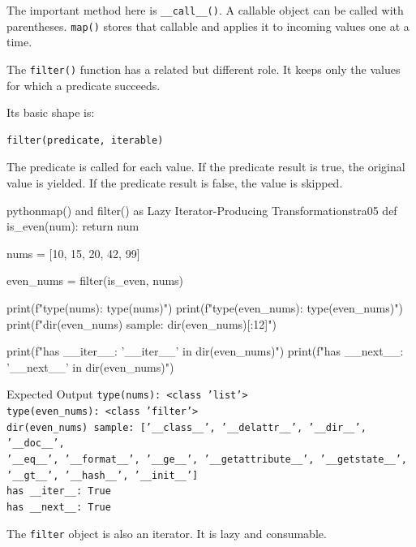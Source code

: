 \documentclass[a4paper,twoside]{report}
\begin{document}
The important method here is \texttt{\_\_call\_\_()}. A callable object can be called with parentheses. \texttt{map()} stores that callable and applies it to incoming values one at a time.

The \texttt{filter()} function has a related but different role. It keeps only the values for which a predicate succeeds.

Its basic shape is:

\begin{verbatim}
filter(predicate, iterable)
\end{verbatim}

The predicate is called for each value. If the predicate result is true, the original value is yielded. If the predicate result is false, the value is skipped.

\begin{codebox}[]{python}{map() and filter() as Lazy Iterator-Producing Transformations}{tra05}
def is_even(num):
    return num %

nums = [10, 15, 20, 42, 99]

even_nums = filter(is_even, nums)

print(f"type(nums): {type(nums)}")
print(f"type(even_nums): {type(even_nums)}")
print(f"dir(even_nums) sample: {dir(even_nums)[:12]}")

print(f"has __iter__: {'__iter__' in dir(even_nums)}")
print(f"has __next__: {'__next__' in dir(even_nums)}")
\end{codebox}


\begin{iobox}{Expected Output}
\texttt{type(nums): <class 'list'>} \\
\texttt{type(even\_nums): <class 'filter'>} \\
\texttt{dir(even\_nums) sample: ['\_\_class\_\_', '\_\_delattr\_\_', '\_\_dir\_\_', '\_\_doc\_\_',} \\
\texttt{'\_\_eq\_\_', '\_\_format\_\_', '\_\_ge\_\_', '\_\_getattribute\_\_', '\_\_getstate\_\_',} \\
\texttt{'\_\_gt\_\_', '\_\_hash\_\_', '\_\_init\_\_']} \\
\texttt{has \_\_iter\_\_: True} \\
\texttt{has \_\_next\_\_: True} \\
\end{iobox}




The \texttt{filter} object is also an iterator. It is lazy and consumable.
\end{document}
